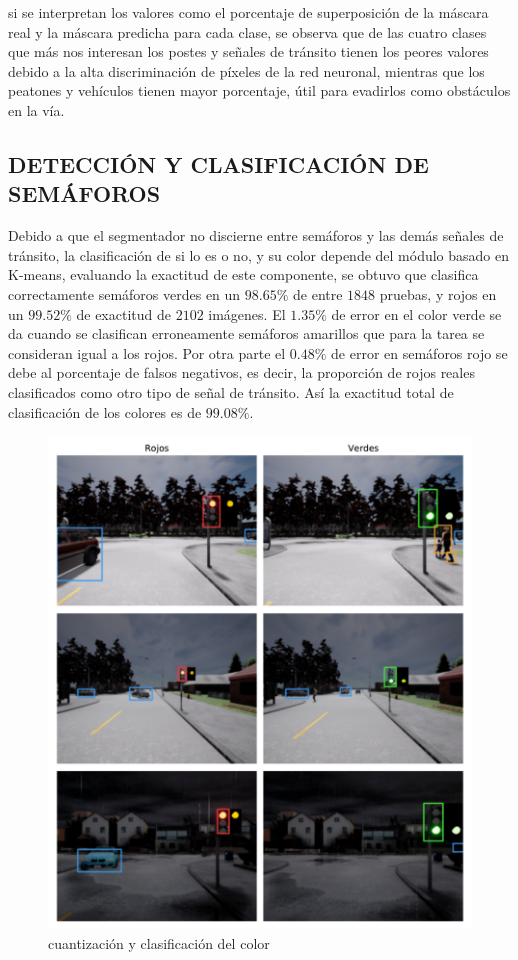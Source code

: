 	si se interpretan los valores como el porcentaje de superposición de la máscara real y la máscara predicha para cada clase, se observa que de las cuatro clases que más nos interesan los postes y señales de tránsito tienen los peores valores debido a la alta discriminación de píxeles de la red neuronal, mientras que los peatones y vehículos tienen mayor porcentaje, útil para evadirlos como obstáculos en la vía.
	
\subsection{DETECCIÓN Y CLASIFICACIÓN DE SEMÁFOROS}
	Debido a que el segmentador no discierne entre semáforos y las demás señales de tránsito, la clasificación de si lo es o no, y su color depende del módulo basado en K-means, evaluando la exactitud de este componente, se obtuvo que clasifica correctamente semáforos verdes en un $98.65\%$ de entre $1848$ pruebas, y rojos en un $99.52\%$ de exactitud de $2102$ imágenes. El $1.35\%$ de error en el color verde se da cuando se clasifican erroneamente semáforos amarillos que para la tarea se consideran igual a los rojos. Por otra parte el $0.48\%$ de error en semáforos rojo se debe al porcentaje de falsos negativos, es decir, la proporción de rojos reales clasificados como otro tipo de señal de tránsito. Así la exactitud total de clasificación de los colores es de $99.08\%$.
	
	\begin{figure}[H]
		\centering
		\includegraphics[scale=0.58]{imagenes/preds/semaforos}
		\caption[Cuantización y Clasificación del Color]{cuantización y clasificación del color}
		\label{semaforos}
	\end{figure}
	
